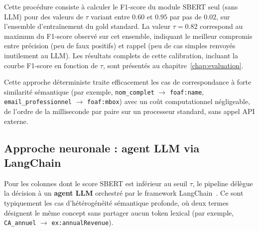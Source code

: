 Cette procédure consiste à calculer le F1-score du module SBERT seul
(sans LLM) pour des valeurs de $\tau$ variant entre $0.60$ et $0.95$
par pas de $0.02$, sur l'ensemble d'entraînement du gold standard.
La valeur $\tau = 0.82$ correspond au maximum du F1-score observé sur
cet ensemble, indiquant le meilleur compromis entre précision (peu de
faux positifs) et rappel (peu de cas simples renvoyés inutilement au
LLM). Les résultats complets de cette calibration, incluant la courbe
F1-score en fonction de $\tau$, sont présentés au
chapitre~\ref{chap:evaluation}.

Cette approche déterministe traite efficacement les cas de
correspondance à forte similarité sémantique (par exemple,
\texttt{nom\_complet} $\rightarrow$ \texttt{foaf:name},
\texttt{email\_professionnel} $\rightarrow$ \texttt{foaf:mbox})
avec un coût computationnel négligeable, de l'ordre de la
milliseconde par paire sur un processeur standard, sans appel API
externe.


\subsection{Approche neuronale : agent LLM via LangChain}
\label{subsec:llm_agent}

Pour les colonnes dont le score SBERT est inférieur au seuil $\tau$,
le pipeline délègue la décision à un \textbf{agent LLM} orchestré
par le framework LangChain~\cite{langchain2023}.
Ce sont typiquement les cas d'hétérogénéité sémantique profonde,
où deux termes désignent le même concept sans partager aucun token
lexical (par exemple, \texttt{CA\_annuel}
$\rightarrow$ \texttt{ex:annualRevenue}).

